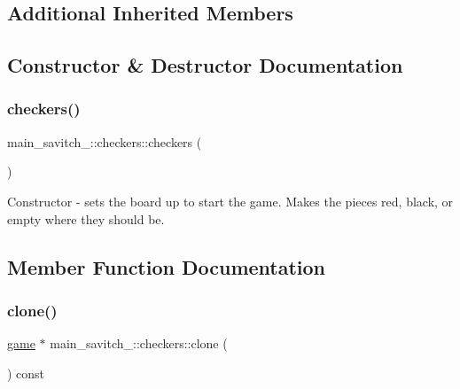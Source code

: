\subsection*{Additional Inherited Members}


\subsection{Constructor \& Destructor Documentation}
\mbox{\label{classmain__savitch__14_1_1checkers_ad57de7d84332c511eff8fb0f9dc3e47d}} 
\subsubsection{\texorpdfstring{checkers()}{checkers()}}
{\footnotesize\ttfamily main\+\_\+savitch\+\_\+::checkers\+::checkers (\begin{DoxyParamCaption}{ }\end{DoxyParamCaption})}

Constructor -\/ sets the board up to start the game. Makes the pieces red, black, or empty where they should be. 

\subsection{Member Function Documentation}
\mbox{\label{classmain__savitch__14_1_1checkers_a716b963325b1455e63c25afe89d617d9}} 
\subsubsection{\texorpdfstring{clone()}{clone()}}
{\footnotesize\ttfamily \hyperlink{classmain__savitch__14_1_1game}{game} $\ast$ main\+\_\+savitch\+\_\+::checkers\+::clone (\begin{DoxyParamCaption}{ }\end{DoxyParamCaption}) const\hspace{0.3cm}{\ttfamily [virtual]}}

